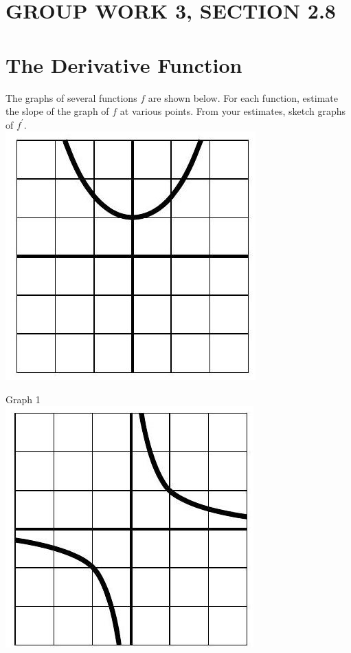 \documentclass[10pt]{article}
\begin{document}
\section*{GROUP WORK 3, SECTION 2.8}
\section*{The Derivative Function}
The graphs of several functions $f$ are shown below. For each function, estimate the slope of the graph of $f$ at various points. From your estimates, sketch graphs of $f^{\prime}$.\\
\includegraphics[max width=\textwidth, center]{2024_12_26_08a12fb3da5425a27925g-5(2)}

Graph 1\\
\includegraphics[max width=\textwidth, center]{2024_12_26_08a12fb3da5425a27925g-5}
\end{document}
